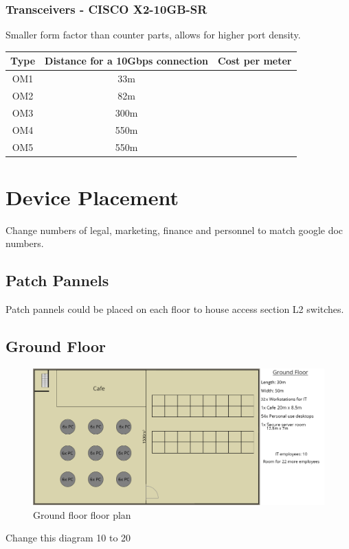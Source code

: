 \subsubsection{Transceivers - CISCO X2-10GB-SR}
Smaller form factor than counter parts, allows for higher port density.\\
\begin{table}[]
    \centering
    \begin{tabular}{|c|c|c|}
    \hline
    Type & Distance for a 10Gbps connection & Cost per meter \\ \hline
    OM1  & 33m                              &                \\ \hline
    OM2  & 82m                              &                \\ \hline
    OM3  & 300m                             &                \\ \hline
    OM4  & 550m                             &                \\ \hline
    OM5  & 550m                             &                \\ \hline
    \end{tabular}
\end{table}
\section{Device Placement}
Change numbers of legal, marketing, finance and personnel to match google doc numbers.
\subsection{Patch Pannels}
Patch pannels could be placed on each floor to house access section L2 switches.
\subsection{Ground Floor}
\begin{figure}[h]
    \includegraphics[width=15cm]{Figures/ground.png}
    \caption{Ground floor floor plan}
    \label{ground_floor}
\end{figure}
Change this diagram 10 to 20
